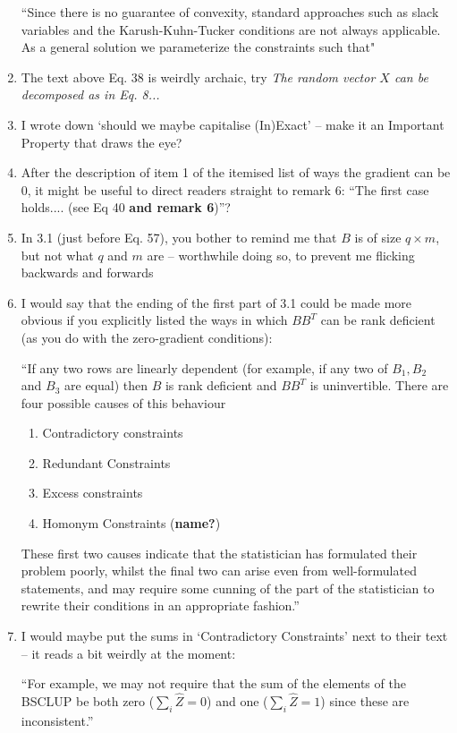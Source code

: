 \documentclass[]{article}
\begin{document}
\begin{enumerate}
			``Since there is no guarantee of convexity, standard approaches such as slack variables and the Karush-Kuhn-Tucker conditions are not always applicable. As a general solution we parameterize the constraints such that"

			\item The text above Eq. 38 is weirdly archaic, try \textit{The random vector $X$ can be decomposed as in Eq. 8...}
			\item I wrote down `should we maybe capitalise (In)Exact' -- make it an Important Property that draws the eye?
			\item After the description of item 1 of the itemised list of ways the gradient can be 0, it might be useful to direct readers straight to remark 6:
			``The first case holds.... (see Eq 40 \textbf{and remark 6})''?
			\item In 3.1 (just before Eq. 57), you bother to remind me that $B$ is of size $q\times m$, but not what $q$ and $m$ are -- worthwhile doing so, to prevent me flicking backwards and forwards
			\item I would say that the ending of the first part of 3.1 could be made more obvious if you explicitly listed the ways in which $BB^T$ can be rank deficient (as you do with the zero-gradient conditions):
			
			``If any two rows are linearly dependent (for example, if any two of $B_1, B_2$ and $B_3$ are equal) then $B$ is rank deficient and $BB^T$ is uninvertible. There are four possible causes of this behaviour
			\begin{enumerate}
				\item Contradictory constraints
				\item Redundant Constraints
				\item Excess constraints
				\item Homonym Constraints (\textbf{name?})
			\end{enumerate}
			These first two causes indicate that the statistician has formulated their problem poorly, whilst the final two can arise even from well-formulated statements, and may require some cunning of the part of the statistician to rewrite their conditions in an appropriate fashion.''

			\item I would maybe put the sums in `Contradictory Constraints' next to their text -- it reads a bit weirdly at the moment:
			
			``For example, we may not require that the sum of the elements of the BSCLUP be both zero ($\sum_i \hat{Z} = 0$) and one ($\sum_i \hat{Z} = 1$) since these are inconsistent.''


\end{enumerate}
\end{document}
